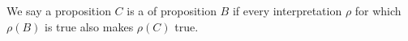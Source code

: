 \begin{node}[Definition]\label{prop-0005}%
We say a proposition $C$ is a  of
proposition $B$ if every interpretation $\rho$ for which $\rho(B)$ is true
also makes $\rho(C)$ true.
\end{node}
